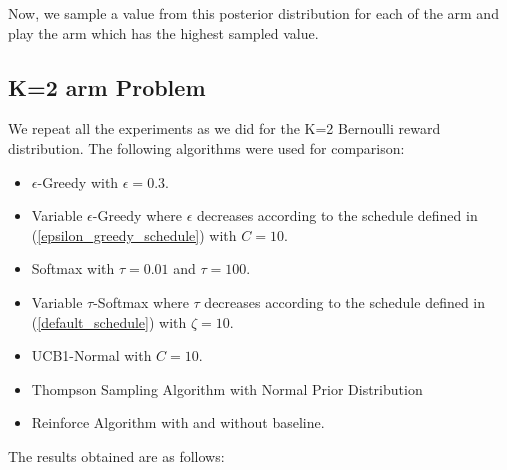 \documentclass{article}
\begin{document}
\begin{itemize}
	Now, we sample a value from this posterior distribution for each of the arm and play the arm which has the highest sampled value. 
	
	\end{itemize}
	\subsection{K=2 arm Problem}
		We repeat all the experiments as we did for the K=2 Bernoulli reward distribution. The following algorithms were used for comparison:
		\begin{itemize}
			\item $\epsilon$-Greedy with $\epsilon=0.3$.
			\item Variable $\epsilon$-Greedy where $\epsilon$ decreases according to the schedule defined in (\ref{epsilon_greedy_schedule}) with $C=10$.
			\item Softmax with $\tau=0.01$ and $\tau=100$. 
			\item Variable $\tau$-Softmax where $\tau$ decreases according to the schedule defined in (\ref{default_schedule}) with $\zeta=10$.
			\item UCB1-Normal with $C=10$.
			\item Thompson Sampling Algorithm with Normal Prior Distribution
			\item Reinforce Algorithm with and without baseline.
		\end{itemize}
		
		The results obtained are as follows:
		
\end{document}
